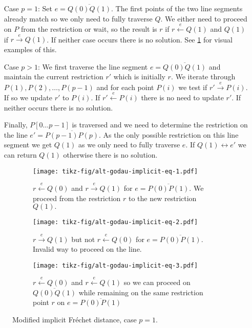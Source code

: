 \begin{itemize}
  \item[Case \(p = 1\): ] Set \(e = \overline{Q(0)Q(1)}\). The first points of the two line segments already match so we only need to fully traverse \(Q\). We either need to proceed on \(P\) from the restriction or wait, so the result is \(r\) if \(r \overset e\leftarrow Q(1)\) and \(Q(1)\) if \(r \overset e\rightarrow Q(1)\). If neither case occurs there is no solution. 
    See \cref{fig:alt_godau_implicit_eq} for visual examples of this.
  \item[Case \(p > 1\): ] We first traverse the line segment \(e = \overline{Q(0)Q(1)}\) and maintain the current restriction \(r'\) which is initially \(r\). We iterate through \(P(1), P(2), \dots, P(p-1)\) and for each point \(P(i)\) we test if \(r' \overset e\rightarrow P(i)\). If so we update \(r'\) to \(P(i)\). If \(r' \overset e\leftarrow P(i)\) there is no need to update \(r'\). If neither occurs there is no solution. 

    Finally, \(P[0\dots p-1]\) is traversed and we need to determine the restriction on the line \(e'=\overline{P(p-1)P(p)}\). As the only possible restriction on this line segment we get \(Q(1)\) as we only need to fully traverse \(e\). If \(Q(1) \leftrightarrow e'\) we can return \(Q(1)\) otherwise there is no solution.
\end{itemize}

\begin{figure}
    \centering
    \begin{subfigure}[t]{0.3\textwidth}
      \texttt{[image: tikz-fig/alt-godau-implicit-eq-1.pdf]}
      \caption{\(r \overset e\leftarrow Q(0)\) and \(r \overset e\rightarrow Q(1)\) for \(e = \overline{P(0)P(1)}\). We proceed from the restriction \(r\) to the new restriction \(Q(1).\)}
    \end{subfigure}
    \begin{subfigure}[t]{0.3\textwidth}
      \texttt{[image: tikz-fig/alt-godau-implicit-eq-2.pdf]}
      \caption{\(r \overset e\rightarrow Q(1)\) but not \(r \overset e\leftarrow Q(0)\) for \(e = \overline{P(0)P(1)}\). Invalid way to proceed on the line.}
    \end{subfigure}
    \begin{subfigure}[t]{0.3\textwidth}
      \texttt{[image: tikz-fig/alt-godau-implicit-eq-3.pdf]}
      \caption{\(r \overset e\leftarrow Q(0)\) and \(r \overset e\leftarrow Q(1)\) so we can proceed on \(\overline{Q(0)Q(1)}\) while remaining on the same restriction point \(r\) on \(e = \overline{P(0)P(1)}\)}
    \end{subfigure}

    \caption{Modified implicit Fréchet distance, case \(p = 1\).}
    \label{fig:alt_godau_implicit_eq}
\end{figure}

